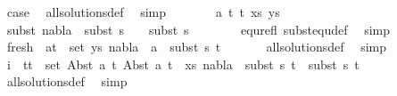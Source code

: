 \begin{isabellebody}
\ {\isacharquery}{\kern0pt}case\ \isamarkupfalse%
\ all{\isacharunderscore}{\kern0pt}solutions{\isacharunderscore}{\kern0pt}def\ \isamarkupfalse%
\ simp\isanewline
\ \isamarkupfalse%
\isanewline
\ \ \ \isamarkupfalse%
\ {\isacharparenleft}{\kern0pt}{}\ a\ t{}\ t{}\ xs\ ys{\isacharparenright}{\kern0pt}\isanewline
\ \ \ \isamarkupfalse%
\ \isamarkupfalse%
\ subst{\isacharcolon}{\kern0pt}\ {\isachardoublequoteopen}nabla{}\ {\isasymTurnstile}\ subst\ {\isacharparenleft}{\kern0pt}s{}\ {\isasymbullet}\ {\isacharbrackleft}{\kern0pt}{\isacharbrackright}{\kern0pt}{\isacharparenright}{\kern0pt}\ {\isasymapprox}\ subst\ s{}{\isachardoublequoteclose}\ \isanewline
\ \ \ \ \ \isamarkupfalse%
\ equ{\isacharunderscore}{\kern0pt}refl\ subst{\isacharunderscore}{\kern0pt}equ{\isacharunderscore}{\kern0pt}def\ \isamarkupfalse%
\ simp\isanewline
\isanewline
\ \ \ \isamarkupfalse%
\ {}\isanewline
\ \ \ \isamarkupfalse%
\ fresh{\isacharcolon}{\kern0pt}\ {\isachardoublequoteopen}{\isasymforall}\ {\isacharparenleft}{\kern0pt}a{\isacharcomma}{\kern0pt}t{\isacharparenright}{\kern0pt}\ {\isasymin}\ set\ ys{\isachardot}{\kern0pt}\ nabla{}\ {\isasymturnstile}\ a\ {\isasymsharp}\ subst\ s{}\ t{\isachardoublequoteclose}\isanewline
\ \ \ \ \ \isamarkupfalse%
\ all{\isacharunderscore}{\kern0pt}solutions{\isacharunderscore}{\kern0pt}def\ \isamarkupfalse%
\ simp\isanewline
\isanewline
\ \ \ \isamarkupfalse%
\ {}\isanewline
\ \ \ \isamarkupfalse%
\ i{\isacharcolon}{\kern0pt}\ {\isachardoublequoteopen}{\isasymforall}\ {\isacharparenleft}{\kern0pt}t{}{\isacharcomma}{\kern0pt}t{}{\isacharparenright}{\kern0pt}\ {\isasymin}\ set\ {\isacharparenleft}{\kern0pt}{\isacharparenleft}{\kern0pt}Abst\ a\ t{}{\isacharcomma}{\kern0pt}\ Abst\ a\ t{}{\isacharparenright}{\kern0pt}\ {\isacharhash}{\kern0pt}\ xs{\isacharparenright}{\kern0pt}{\isachardot}{\kern0pt}\ nabla{}\ {\isasymturnstile}\ subst\ s{}\ t{}\ {\isasymapprox}\ subst\ s{}\ t{}{\isachardoublequoteclose}\isanewline
\ \ \ \ \ \isamarkupfalse%
\ all{\isacharunderscore}{\kern0pt}solutions{\isacharunderscore}{\kern0pt}def\ \isamarkupfalse%
\ simp\isanewline
\ \ \ \isamarkupfalse%

\end{isabellebody}
